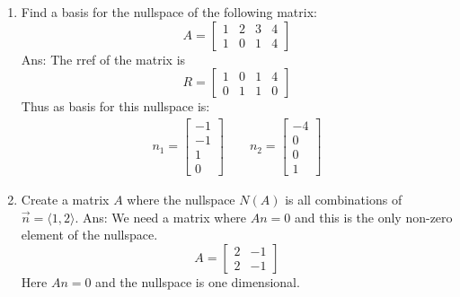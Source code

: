 \documentclass[10pt, a4paper]{article}
\theoremstyle{break}
\begin{document}
\begin{enumerate}
\item Find a basis for the nullspace of the following matrix:
\begin{equation}
A=
\begin{bmatrix}
1 & 2 & 3 &4 \\
1 &0 & 1 &4 
\end{bmatrix}
\nonumber
\end{equation}
Ans: The rref of the matrix is 
\begin{equation}
R=
\begin{bmatrix}
1 & 0 & 1 &4 \\
0 &1& 1 &0
\end{bmatrix}
\nonumber
\end{equation}
Thus as basis for this nullspace is:
\begin{align}
n_1=\begin{bmatrix} -1 \\ -1 \\1 \\ 0\end{bmatrix} \qquad n_2=\begin{bmatrix} -4\\ 0 \\ 0 \\ 1 \end{bmatrix} 
\end{align}






\item Create a matrix $A$ where the nullspace $N(A)$ is all combinations of $\vec{n}=\langle 1, 2 \rangle$.
Ans: We need a matrix where $An=0$ and this is the only non-zero element of the nullspace. 
\begin{equation}
A=
\begin{bmatrix}
2 & -1  \\
2 &-1
\end{bmatrix}
\nonumber
\end{equation}
Here $An=0$ and the nullspace is one dimensional. 




\end{enumerate}
\end{document}
